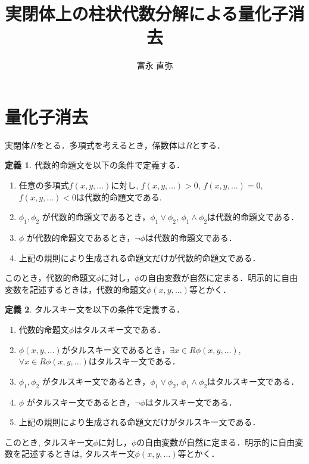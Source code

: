 \documentclass[uplatex, dvipdfmx]{jsarticle}
\theoremstyle{definition}
\newtheorem{definition}{定義}[section]
\begin{document}
\title{実閉体上の柱状代数分解による量化子消去}
\author{富永 直弥}
\maketitle

\section{量化子消去}
実閉体$R$をとる．多項式を考えるとき，係数体は$R$とする．


\begin{definition}
     代数的命題文を以下の条件で定義する．
     \begin{enumerate}
          \item 任意の多項式$f(x, y, \dots)$に対し, $f(x,y, \dots) > 0$, $f(x,y, \dots) = 0$, $f(x,y, \dots) < 0$は代数的命題文である.
          \item $\phi_1, \phi_2$ が代数的命題文であるとき，$\phi_1 \lor \phi_2$, $\phi_1 \land \phi_2$は代数的命題文である．
          \item $\phi$ が代数的命題文であるとき，$\lnot \phi$は代数的命題文である．
          \item 上記の規則により生成される命題文だけが代数的命題文である．
     \end{enumerate}
     このとき，代数的命題文$\phi$に対し，$\phi$の自由変数が自然に定まる．明示的に自由変数を記述するときは，代数的命題文$\phi(x,y,\dots)$等とかく．
\end{definition}

\begin{definition}
     タルスキー文を以下の条件で定義する．
     \begin{enumerate}
          \item 代数的命題文$\phi$はタルスキー文である．
          \item $\phi(x,y,\dots)$がタルスキー文であるとき，$\exists x \in R \phi(x,y,\dots)$, $\forall x \in R \phi(x,y,\dots)$はタルスキー文である．
          \item $\phi_1, \phi_2$ がタルスキー文であるとき，$\phi_1 \lor \phi_2$, $\phi_1 \land \phi_2$はタルスキー文である．
          \item $\phi$ がタルスキー文であるとき，$\lnot \phi$はタルスキー文である．
          \item 上記の規則により生成される命題文だけがタルスキー文である．
     \end{enumerate}
     このとき, タルスキー文$\phi$に対し，$\phi$の自由変数が自然に定まる．明示的に自由変数を記述するときは, タルスキー文$\phi(x, y, \dots)$等とかく． 
\end{definition}
\end{document}

